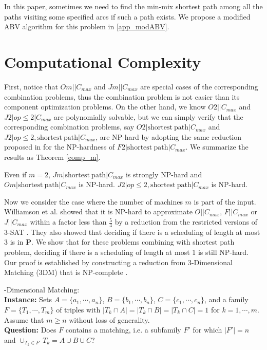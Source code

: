 \documentclass{llncs}
\numberwithin{subcase}{case}
\begin{document}
In this paper, sometimes we need to find the min-mix shortest path among all the paths visiting some specified arcs if such a path exists. We propose a modified ABV algorithm for this problem in \ref{app_modABV}.

\section{Computational Complexity}\label{sec_com}
First, notice that $Om||C_{max}$ and $Jm||C_{max}$ are special cases of the corresponding combination problems, thus the combination problem is not easier than its component optimization problems. On the other hand, we know $O2||C_{max}$ and $J2|op\leq 2|C_{max}$ are polynomially solvable, but we can simply verify that the corresponding combination problems, say $O2|\mathrm{shortest}~\mathrm{path}|C_{max}$ and $J2|op\leq 2, \mathrm{shortest}~\mathrm{path}|C_{max}$, are $\mathrm{NP}$-hard by adopting the same reduction proposed in \cite{NW13} for the $\mathrm{NP}$-hardness of $F2|\mathrm{shortest}~\mathrm{path}|C_{max}$. We summarize the results as Theorem \ref{comp_m}.

\begin{theorem}
Even if $m = 2$, $Jm|\mathrm{shortest}~\mathrm{path}|C_{max}$ is strongly $\mathrm{NP}$-hard and $Om|\mathrm{shortest}~\mathrm{path}|C_{max}$ is $\mathrm{NP}$-hard. $J2|op\leq 2, \mathrm{shortest}~\mathrm{path}|C_{max}$ is $\mathrm{NP}$-hard. \label{comp_m}
\end{theorem}

Now we consider the case where the number of machines $m$ is part of the input. Williamson et al. showed that it is $\mathrm{NP}$-hard to approximate $O||C_{max}$, $F||C_{max}$ or $J||C_{max}$ within a factor less than $\frac{5}{4}$ by a reduction from the restricted versions of 3-SAT \cite{Williamson97}. They also showed that deciding if there is a scheduling of length at most 3 is in $\mathbf{P}$.
We show that for these problems combining with shortest path problem, deciding if there is a scheduling of length at most 1 is still $\mathrm{NP}$-hard. Our proof is established by constructing a reduction from 3-Dimensional Matching (3DM) that is $\mathrm{NP}$-complete \cite{GJ79}.

{-Dimensional Matching}:\\
{\bf Instance:} Sets $A = \{a_1, \cdots, a_n\}$, $B = \{b_1, \cdots, b_n\}$, $C = \{c_1, \cdots, c_n\}$, and a family $F = \{T_1, \cdots, T_m\}$ of triples with $|T_k\cap A| = |T_k\cap B| = |T_k\cap C| = 1$ for $k = 1, \cdots, m$. Assume that $m\geq n$ without loss of generality.\\
{\bf Question:} Does $F$ contains a matching, i.e. a subfamily $F'$ for which $|F'| = n$ and $\cup_{T_k\in F'}T_k = A \cup B \cup C$?
\end{document}
